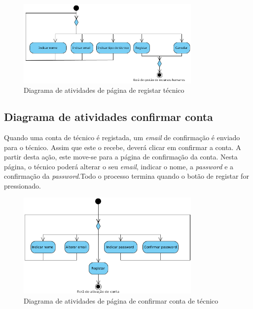 \begin{figure}[htb]
  \centering
  \includegraphics[width=0.8\textwidth]{images/diagramas/atividades/diagrama_atividades_add_professional.png}
  \caption{Diagrama de atividades de página de registar técnico}
  \label{fig:31}
\end{figure}

\subsection{Diagrama de atividades confirmar conta}

Quando uma conta de técnico é registada, um \textit{email} de confirmação é enviado para o técnico. Assim que este o recebe, deverá clicar em confirmar a conta. A partir desta ação, este move-se para a página de confirmação da conta. Nesta página, o técnico poderá alterar o seu \textit{email}, indicar o nome, a \textit{password} e a confirmação da \textit{password}.Todo o processo termina quando o botão de registar for pressionado.

\begin{figure}[htb]
  \centering
  \includegraphics[width=0.8\textwidth]{images/diagramas/atividades/diagrama_atividades_prof_register.png}
  \caption{Diagrama de atividades de página de confirmar conta de técnico}
  \label{fig:31}
\end{figure}